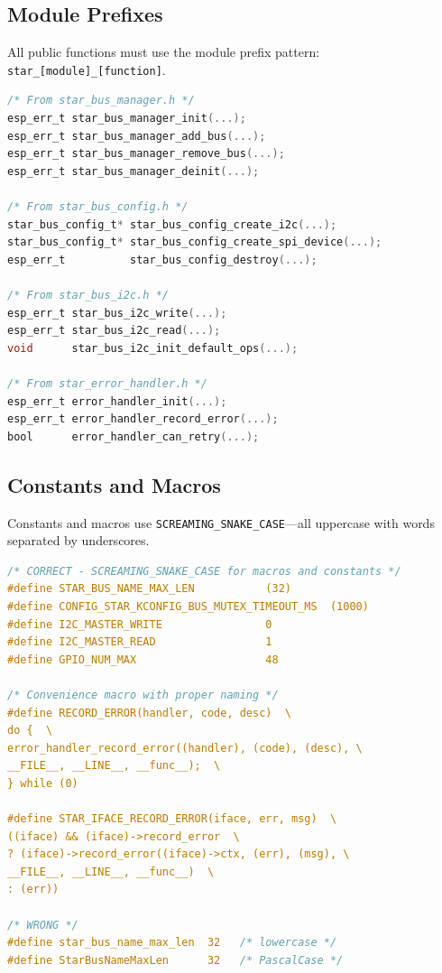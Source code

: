 \subsection{Module Prefixes}

All public functions must use the module prefix pattern: \texttt{star\_[module]\_[function]}.

\begin{lstlisting}[language=C]
/* From star_bus_manager.h */
esp_err_t star_bus_manager_init(...);
esp_err_t star_bus_manager_add_bus(...);
esp_err_t star_bus_manager_remove_bus(...);
esp_err_t star_bus_manager_deinit(...);

/* From star_bus_config.h */
star_bus_config_t* star_bus_config_create_i2c(...);
star_bus_config_t* star_bus_config_create_spi_device(...);
esp_err_t          star_bus_config_destroy(...);

/* From star_bus_i2c.h */
esp_err_t star_bus_i2c_write(...);
esp_err_t star_bus_i2c_read(...);
void      star_bus_i2c_init_default_ops(...);

/* From star_error_handler.h */
esp_err_t error_handler_init(...);
esp_err_t error_handler_record_error(...);
bool      error_handler_can_retry(...);
\end{lstlisting}

\subsection{Constants and Macros}

Constants and macros use \texttt{SCREAMING\_SNAKE\_CASE}---all uppercase with words separated by underscores.

\begin{lstlisting}[language=C]
/* CORRECT - SCREAMING_SNAKE_CASE for macros and constants */
#define STAR_BUS_NAME_MAX_LEN           (32)
#define CONFIG_STAR_KCONFIG_BUS_MUTEX_TIMEOUT_MS  (1000)
#define I2C_MASTER_WRITE                0
#define I2C_MASTER_READ                 1
#define GPIO_NUM_MAX                    48

/* Convenience macro with proper naming */
#define RECORD_ERROR(handler, code, desc)  \
do {  \
error_handler_record_error((handler), (code), (desc), \
__FILE__, __LINE__, __func__);  \
} while (0)

#define STAR_IFACE_RECORD_ERROR(iface, err, msg)  \
((iface) && (iface)->record_error  \
? (iface)->record_error((iface)->ctx, (err), (msg), \
__FILE__, __LINE__, __func__)  \
: (err))

/* WRONG */
#define star_bus_name_max_len  32   /* lowercase */
#define StarBusNameMaxLen      32   /* PascalCase */
\end{lstlisting}


